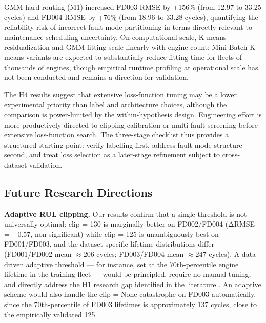 \documentclass[review,12pt]{elsarticle}
\begin{document}
GMM hard-routing (M1) increased FD003 RMSE by +156\% (from 12.97 to 33.25 cycles) and FD004 RMSE by +76\% (from 18.96 to 33.28 cycles), quantifying the reliability risk of incorrect fault-mode partitioning in terms directly relevant to maintenance scheduling uncertainty. On computational scale, K-means residualization and GMM fitting scale linearly with engine count; Mini-Batch K-means variants are expected to substantially reduce fitting time for fleets of thousands of engines, though empirical runtime profiling at operational scale has not been conducted and remains a direction for validation.

The H4 results suggest that extensive loss-function tuning may be a lower experimental priority than label and architecture choices, although the comparison is power-limited by the within-hypothesis design. Engineering effort is more productively directed to clipping calibration or multi-fault screening before extensive loss-function search. The three-stage checklist thus provides a structured starting point: verify labelling first, address fault-mode structure second, and treat loss selection as a later-stage refinement subject to cross-dataset validation.

\subsection{Future Research Directions}

\textbf{Adaptive RUL clipping.} Our results confirm that a single threshold is not universally optimal: clip = 130 is marginally better on FD002/FD004 (ΔRMSE = −0.57, non-significant) while clip = 125 is unambiguously best on FD001/FD003, and the dataset-specific lifetime distributions differ (FD001/FD002 mean $\approx 206$ cycles; FD003/FD004 mean $\approx 247$ cycles). A data-driven adaptive threshold — for instance, set at the 70th-percentile engine lifetime in the training fleet — would be principled, require no manual tuning, and directly address the H1 research gap identified in the literature \cite{ref18,ref20}. An adaptive scheme would also handle the clip = None catastrophe on FD003 automatically, since the 70th-percentile of FD003 lifetimes is approximately 137 cycles, close to the empirically validated 125.
\end{document}
